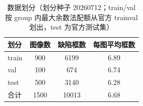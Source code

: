 \begin{table}[t]
\centering
\caption{数据划分（划分种子 20260712；train/val 按 group 内最大余数法配额从官方 trainval 划出，test 为官方测试集）}
\label{tab:split}
\small
\begin{tabular}{lccc}
\toprule
划分 & 图像数 & 缺陷框数 & 每图平均框数 \\
\midrule
train & 900 & 6199 & 6.89 \\
val & 100 & 674 & 6.74 \\
test & 500 & 3140 & 6.28 \\
\midrule
合计 & 1500 & 10013 & 6.68 \\
\bottomrule
\end{tabular}
\end{table}
